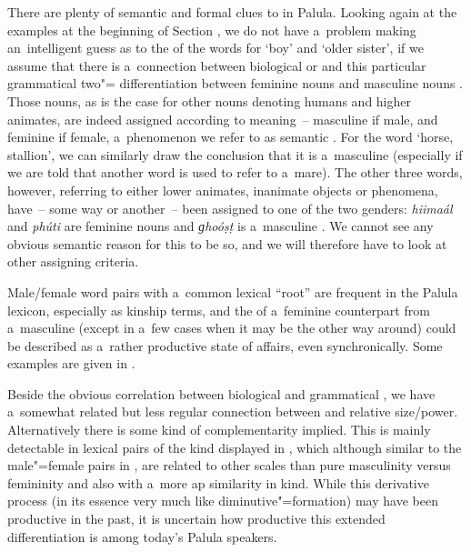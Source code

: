 There are plenty of semantic and formal clues to  in Palula. Looking again at the examples at the beginning of Section , we do not have a~problem making an~intelligent guess as to the  of the words for `boy' and `older sister', if we assume that there is a~connection between biological  or  and this particular grammatical two"= differentiation between feminine nouns and masculine nouns \citep[102]{dahl2000}. Those nouns, as is the case for other nouns denoting humans and higher animates, are indeed assigned  according to meaning~-- masculine  if male, and feminine if female, a~phenomenon we refer to as semantic  \citep[7--32]{corbett1991}. For the word `horse, stallion', we can similarly draw the conclusion that it is a~masculine  (especially if we are told that another word is used to refer to a~mare). The other three words, however, referring to either lower animates, inanimate objects or phenomena, have~-- some way or another~-- been assigned to one of the two genders: \textit{hiimaál} and \textit{phúti} are feminine nouns and \textit{ɡhoóṣṭ} is a~masculine . We cannot see any obvious semantic reason for this to be so, and we will therefore have to look at other assigning criteria.


Male/female word pairs with a~common lexical ``root'' are frequent in the Palula lexicon, especially as kinship terms, and the  of a~feminine counterpart from a~masculine (except in a~few cases when it may be the other way around) could be described as a~rather productive state of affairs, even synchronically. Some examples are given in .


Beside the obvious correlation between biological and grammatical , we have a~somewhat related but less regular connection between  and relative size/power. Alternatively there is some kind of complementarity implied. This is mainly detectable in lexical pairs of the kind displayed in , which although similar to the male"=female pairs in , are related to other scales than pure masculinity versus femininity and also with a~more ap similarity in kind. While this derivative process (in its essence very much like diminutive"=formation) may have been productive in the past, it is uncertain how productive this extended  differentiation is among today's Palula speakers.



